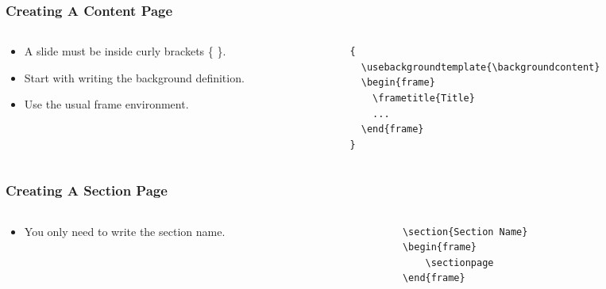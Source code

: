 \begin{slide}
  \frametitle{Creating A Content Page}
  \begin{columns}
    \begin{column}{.4\textwidth}
      \begin{itemize}
        \item A slide must be inside curly brackets \{ \}.
        \item Start with writing the background definition.
        \item Use the usual frame environment.
      \end{itemize}
    \end{column}
    \begin{column}{.6\textwidth}
      \small
      \begin{verbatim}
{
  \usebackgroundtemplate{\backgroundcontent}
  \begin{frame}
    \frametitle{Title}
    ...
  \end{frame}
}
      \end{verbatim}
    \end{column}
  \end{columns}
\end{slide}

\begin{slide}
  \frametitle{Creating A Section Page}
  \begin{columns}
    \begin{column}{.4\textwidth}
      \begin{itemize}
        \item You only need to write the section name.
      \end{itemize}
    \end{column}
    \begin{column}{.6\textwidth}
      \small
      \begin{verbatim}
\section{Section Name}
\begin{frame}
    \sectionpage
\end{frame}
      \end{verbatim}
    \end{column}
  \end{columns}
\end{slide}



